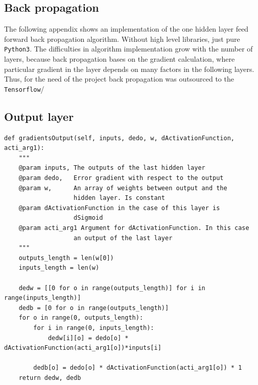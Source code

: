 \begin{appendices}

\begingroup
\renewcommand{\cleardoublepage}{}
\renewcommand{\clearpage}{}
\chapter{Back propagation} \label{ch:back}
\endgroup
The following appendix shows an implementation of the one hidden layer feed forward back propagation algorithm. Without high level libraries, just pure \verb|Python3|. The difficulties in algorithm implementation grow with the number of layers, because back propagation bases on the gradient calculation, where particular gradient in the layer depends on many factors in the following layers. Thus, for the need of the project back propagation was outsourced to the \verb|Tensorflow|/
\section{Output layer}
\begin{verbatim}
def gradientsOutput(self, inputs, dedo, w, dActivationFunction, acti_arg1):
    """
    @param inputs, The outputs of the last hidden layer
    @param dedo,   Error gradient with respect to the output
    @param w,      An array of weights between output and the 
                   hidden layer. Is constant
    @param dActivationFunction in the case of this layer is 
                   dSigmoid 
    @param acti_arg1 Argument for dActivationFunction. In this case
                   an output of the last layer
    """
    outputs_length = len(w[0])
    inputs_length = len(w)

    dedw = [[0 for o in range(outputs_length)] for i in range(inputs_length)]
    dedb = [0 for o in range(outputs_length)]
    for o in range(0, outputs_length): 
        for i in range(0, inputs_length):
            dedw[i][o] = dedo[o] * dActivationFunction(acti_arg1[o])*inputs[i]
        
        dedb[o] = dedo[o] * dActivationFunction(acti_arg1[o]) * 1
    return dedw, dedb
\end{verbatim}

\end{appendices}
